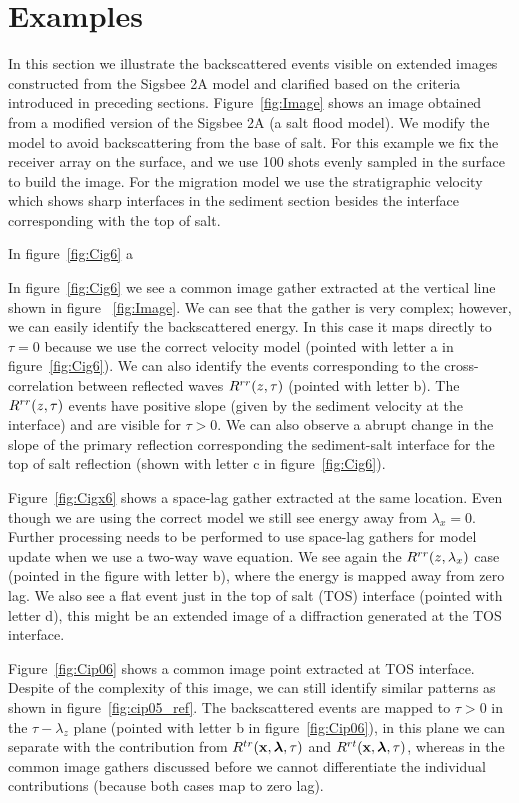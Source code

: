 \section{Examples}

In this section we illustrate the backscattered events visible on extended images constructed from the Sigsbee 2A model
and clarified based on the criteria introduced in preceding sections. Figure~\ref{fig:Image} shows an image obtained from  a modified
version of the Sigsbee 2A (a salt flood model). We modify the model to avoid backscattering from the base 
of salt. For this example we fix the receiver array on the surface, and we use 100 shots evenly sampled in the surface to build 
the image. For the migration model we use the stratigraphic
velocity which shows sharp interfaces in the sediment section besides the interface corresponding with the top of salt.

In figure~\ref{fig:Cig6} a 





In figure~\ref{fig:Cig6} we see a common image gather extracted at the vertical line shown in figure ~\ref{fig:Image}.
We can see that the gather is very complex; however, we can easily identify the backscattered energy. In this
case it maps directly to $\tau=0$ because we use the correct velocity model (pointed with letter a in figure~\ref{fig:Cig6}).
We can also identify the events corresponding to the cross-correlation between reflected waves $R^{rr}(z,\tau)$ (pointed
with letter b). The $R^{rr}(z,\tau)$ events have positive slope (given by the sediment velocity at the interface) and are 
visible for $\tau>0$. We can also observe a abrupt change
in the slope of the primary reflection corresponding the sediment-salt interface for the top of salt reflection (shown with
letter c in figure~\ref{fig:Cig6}).

Figure~\ref{fig:Cigx6} shows a space-lag gather extracted at the same location. Even though we are using the correct model 
we still see energy away from $\lambda_x=0$. Further processing needs to be performed to use space-lag gathers for model update
when we use a two-way wave equation. We see again the $R^{rr}(z,\lambda_x)$ case (pointed in the figure with letter b), 
where the energy is mapped away from zero lag.  We also see a flat event just in the
top of salt (TOS) interface (pointed with letter d), this might be an extended image of a diffraction generated at the TOS interface.

Figure~\ref{fig:Cip06} shows a common image point extracted at TOS interface. Despite of the complexity of this image, we can still
identify similar patterns as shown in figure~\ref{fig:cip05_ref}. The backscattered events are mapped to $\tau>0$ in the
$\tau-\lambda_z$ plane (pointed with letter b in figure~\ref{fig:Cip06}), in this plane we can separate with the contribution 
from $R^{tr}({\bf x},{\boldsymbol{\lambda}},\tau)$ and $R^{rt}({\bf x},{\boldsymbol{\lambda}},\tau)$, whereas in the common image gathers discussed before  we cannot differentiate the individual
contributions (because both cases map to zero lag).

